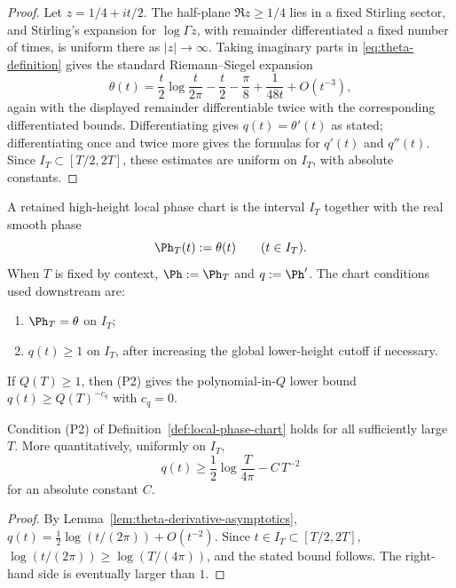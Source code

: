 \begin{proof}
Let \(z=1/4+it/2\).  The half-plane \(\Re z\ge 1/4\) lies in a fixed
Stirling sector, and Stirling's expansion for \(\log\Gamma z\), with
remainder differentiated a fixed number of times, is uniform there as
\(|z|\to\infty\).  Taking imaginary parts in \eqref{eq:theta-definition}
gives the standard Riemann--Siegel expansion
\[
\theta(t)=\frac{t}{2}\log\frac{t}{2\pi}-\frac{t}{2}-\frac{\pi}{8}
          +\frac{1}{48 t}+O(t^{-3}),
\]
again with the displayed remainder differentiable twice with the
corresponding differentiated bounds.  Differentiating gives
\(q(t)=\theta'(t)\) as stated; differentiating once and twice more gives
the formulas for \(q'(t)\) and \(q''(t)\).  Since
\(I_T\subset[T/2,2T]\), these estimates are uniform on \(I_T\), with
absolute constants.
\end{proof}

\begin{definition}
\label{def:local-phase-chart}
A retained high-height local phase chart is the interval \(I_T\)
together with the real smooth phase
\[
        \Ph_T(t):=\theta(t)\qquad (t\in I_T).
\]
When \(T\) is fixed by context, \(\Ph := \Ph_T\) and \(q := \Ph'\).
The chart conditions used downstream are:
\begin{enumerate}[label=\textup{(P\arabic*)},leftmargin=*]
\item \(\Ph_T = \theta\) on \(I_T\);
\item \(q(t)\ge 1\) on \(I_T\), after increasing the global lower-height
      cutoff if necessary.
\end{enumerate}
If \(Q(T)\ge 1\), then (P2) gives the polynomial-in-\(Q\) lower bound
\(q(t)\ge Q(T)^{-c_q}\) with \(c_q = 0\).
\end{definition}

\begin{lemma}
\label{lem:phase-derivative-lower-bound}
Condition \textup{(P2)} of Definition~\ref{def:local-phase-chart}
holds for all sufficiently large \(T\).  More quantitatively, uniformly
on \(I_T\),
\[
        q(t)\ge \frac12\log\frac{T}{4\pi}-C\,T^{-2}
\]
for an absolute constant \(C\).
\end{lemma}

\begin{proof}
By Lemma~\ref{lem:theta-derivative-asymptotics},
\(q(t)=\tfrac12\log(t/(2\pi))+O(t^{-2})\).  Since
\(t \in I_T \subset [T/2, 2T]\),
\(\log(t/(2\pi)) \ge \log(T/(4\pi))\), and the stated bound follows.
The right-hand side is eventually larger than \(1\).
\end{proof}

